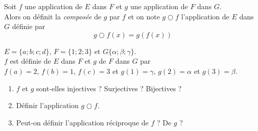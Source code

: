 \documentclass[a4paper,12pt,french]{book}
\begin{document}
\begin{definition}
Soit $f$ une application de $E$ dans $F$ et $g$ une application de $F$ dans $G$.\\
Alors on définit la \textit{composée} de $g$ par $f$ et on note $g\bigcirc f$ l'application de $E$ dans $G$ définie par
$$g\bigcirc f (x)= g\left(f(x)\right)$$
\end{definition}
\begin{exemple}[]
\end{exemple}

\begin{exercice}[]
$E=\{a;b;c;d\}$, $F=\{1;2;3\}$ et $G\{\alpha;\beta;\gamma\}$.\\
$f$ est définie de $E$ dans $F$  et $g$ de $F$ dans $G$ par\\
$f(a)=2$, $f(b)=1$, $f(c)=3$ et $g(1)=\gamma$, $g(2)=\alpha$ et $g(3)=\beta$.

\begin{enumerate}[\bfseries 1.]
	\item 	$f$ et $g$ sont-elles injectives ? Surjectives ? Bijectives ?
	\item 	Définir l'application $g\bigcirc f$.
	\item 	Peut-on définir l'application réciproque de $f$ ? De $g$ ?
\end{enumerate}

\end{exercice}
\end{document}
